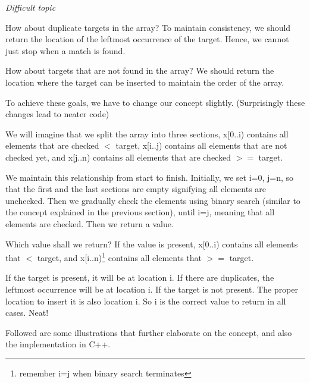 \textit{Difficult topic}
\vspace{6mm}

How about duplicate targets in the array? To maintain consistency, we should return the location of the leftmost occurrence of the target. Hence, we cannot just stop when a match is found.

How about targets that are not found in the array? We should return the location where the target can be inserted to maintain the order of the array. 

To achieve these goals, we have to change our concept slightly. (Surprisingly these changes lead to neater code)
\vspace{6mm}

We will imagine that we split the array into three sections, x[0..i) contains all elements that are checked $<$ target, x[i..j) contains all elements that are not checked yet, and x[j..n) contains all elements that are checked $>=$ target. 

We maintain this relationship from start to finish. Initially, we set i=0, j=n, so that the first and the last sections are empty signifying all elements are unchecked. Then we gradually check the elements using binary search (similar to the concept explained in the previous section), until i=j, meaning that all elements are checked. Then we return a value.
\vspace{6mm}

Which value shall we return? If the value is present, x[0..i) contains all elements that $<$ target, and x[i..n)\footnote{remember i=j when binary search terminates} contains all elements that $>=$ target. 

If the target is present, it will be at location i. If there are duplicates, the leftmost occurrence will be at location i. If the target is not present. The proper location to insert it is also location i. So i is the correct value to return in all cases. Neat!
\vspace{6mm}

Followed are some illustrations that further elaborate on the concept, and also the implementation in C++.
\vspace{6mm}

